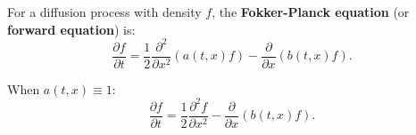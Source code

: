 For a diffusion process with density $f$, the \textbf{Fokker-Planck equation} (or \textbf{forward equation}) is:
$$\frac{\partial f}{\partial t} = \frac{1}{2} \frac{\partial^2}{\partial x^2}(a(t, x) f) - \frac{\partial}{\partial x}(b(t, x) f).$$

When $a(t, x) \equiv 1$:
$$\frac{\partial f}{\partial t} = \frac{1}{2} \frac{\partial^2 f}{\partial x^2} - \frac{\partial}{\partial x}(b(t, x) f).$$
